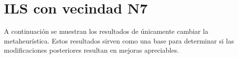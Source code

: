 \section{ILS con vecindad N7}
A continuación se muestran los resultados de únicamente cambiar la metaheurística. Estos resultados sirven como una base para determinar si las modificaciones posteriores resultan en mejoras apreciables.



